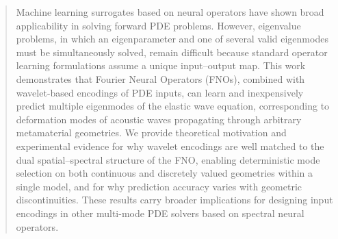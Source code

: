 \documentclass[preprint,review,12pt,numafflabel]{elsarticle}
\begin{document}
\begin{frontmatter}
\author[Mech]{Han Zhang}
\author[Caltech]{Alexander Ogren}
\author[Comp]{Cynthia Rudin}
\author[Mech]{\protect\\Johann Guilleminot}
\author[Mech]{L. Catherine Brinson}
\begin{abstract}
Machine learning surrogates based on neural operators have shown broad applicability in solving forward PDE problems. However, eigenvalue problems, in which an eigenparameter and one of several valid eigenmodes must be simultaneously solved, remain difficult because standard operator learning formulations assume a unique input--output map. This work demonstrates that Fourier Neural Operators (FNOs), combined with wavelet-based encodings of PDE inputs, can learn and inexpensively predict multiple eigenmodes of the elastic wave equation, corresponding to deformation modes of acoustic waves propagating through arbitrary metamaterial geometries. We provide theoretical motivation and experimental evidence for why wavelet encodings are well matched to the dual spatial--spectral structure of the FNO, enabling deterministic mode selection on both continuous and discretely valued geometries within a single model, and for why prediction accuracy varies with geometric discontinuities. These results carry broader implications for designing input encodings in other multi-mode PDE solvers based on spectral neural operators.

\end{abstract}


\end{frontmatter}
\end{document}
